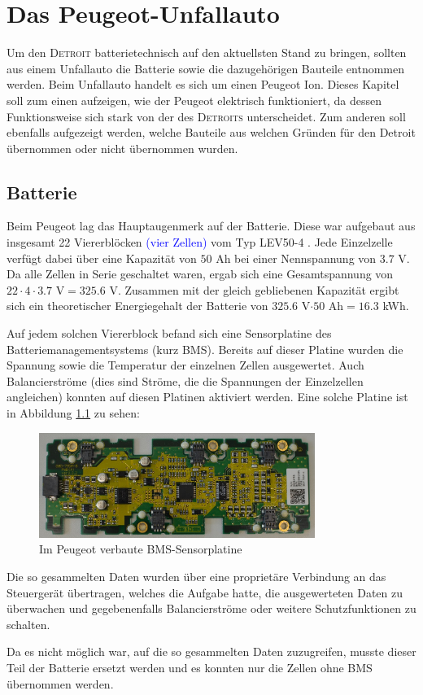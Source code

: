 \chapter{Das Peugeot-Unfallauto}
Um den \textsc{Detroit} batterietechnisch auf den aktuellsten Stand zu bringen, sollten aus einem Unfallauto die Batterie sowie die dazugehörigen Bauteile entnommen werden. Beim Unfallauto handelt es sich um einen Peugeot Ion. Dieses Kapitel soll zum einen aufzeigen, wie der Peugeot elektrisch funktioniert, da dessen Funktionsweise sich stark von der des \textsc{Detroits} unterscheidet. Zum anderen soll ebenfalls aufgezeigt werden, welche Bauteile aus welchen Gründen für den {Detroit} übernommen oder nicht übernommen wurden.

\section{Batterie}
Beim Peugeot lag das Hauptaugenmerk auf der Batterie. Diese war aufgebaut aus insgesamt 22 Viererblöcken \textcolor{blue}{(vier Zellen)} vom Typ LEV50-4 \cite{lev50}. Jede Einzelzelle verfügt dabei über eine Kapazität von $50$ Ah bei einer Nennspannung von $3.7$ V. Da alle Zellen in Serie geschaltet waren, ergab sich eine Gesamtspannung von $22\cdot 4\cdot 3.7$ V$=325.6$ V. Zusammen mit der gleich gebliebenen Kapazität ergibt sich ein theoretischer Energiegehalt der Batterie von $325.6$ V$\cdot50$ Ah$=16.3$ kWh.

Auf jedem solchen Viererblock befand sich eine Sensorplatine des Batteriemanagementsystems (kurz BMS). Bereits auf dieser Platine wurden die Spannung sowie die Temperatur der einzelnen Zellen ausgewertet. Auch Balancierströme (dies sind Ströme, die die Spannungen der Einzelzellen angleichen) konnten auf diesen Platinen aktiviert werden. Eine solche Platine ist in Abbildung \ref{fig:BMS_Alt} zu sehen:

\begin{figure}[h!]
	\centering
		\includegraphics[width=0.80\textwidth]{images/BMS_Alt.JPG}
	\caption{Im Peugeot verbaute BMS-Sensorplatine}
	\label{fig:BMS_Alt}
\end{figure}

Die so gesammelten Daten wurden über eine proprietäre Verbindung an das Steuergerät übertragen, welches die Aufgabe hatte, die ausgewerteten Daten zu überwachen und gegebenenfalls Balancierströme oder weitere Schutzfunktionen zu schalten.

Da es nicht möglich war, auf die so gesammelten Daten zuzugreifen, musste dieser Teil der Batterie ersetzt werden und es konnten nur die Zellen ohne BMS übernommen werden.


\newpage